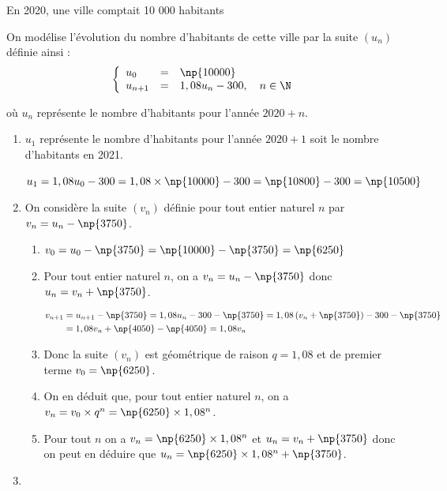 \medskip

En 2020, une ville comptait 10 000 habitants

On modélise l'évolution du nombre d'habitants de cette ville par la suite $(u_n)$ définie ainsi : 
\[\left\{\begin{array}{l c l}
u_0&=&\np{10000}\\
u_{n+1}&=&1,08u_n - 300,\quad n \in \N 
\end{array}\right.\]

où $u_n$ représente le nombre d'habitants pour l'année $2020 + n$.



\begin{enumerate}
\item
$u_1$  représente le nombre d'habitants pour l'année $2020 + 1$ soit le nombre d'habitants en 2021.

$u_{1}=1,08 u_0 - 300 = 1,08\times \np{10000}-300 = \np{10800}-300=\np{10500}$

\item On considère la suite $(v_n)$ définie pour tout entier naturel $n$ par $v_n = u_n  - \np{3750}$. 
	\begin{enumerate}
		\item 
$v_0=u_0 - 	\np{3750} = \np{10000} - \np{3750} = \np{6250}$
		
		\item 
Pour tout entier naturel $n$, on a $v_n=u_n-\np{3750}$ donc $u_n=v_n+\np{3750}$.

$\begin{aligned}
v_{n+1}
& =u_{n+1}-\np{3750}
 = 1,08u_n -300 -\np{3750}
= 1,08\left ( v_n +\np{3750} \right ) -300 - \np{3750}\\
& =1,08 v_n + \np{4050} - \np{4050}
= 1,08 v_n
\end{aligned}$

		\item
Donc la suite $(v_n)$ est géométrique de raison $q=1,08$ et de premier terme $v_0 = \np{6250}$.

		\item On en déduit que, pour tout entier naturel $n$, on a 
$v_n=v_0\times q^n = \np{6250}\times 1,08^n$.		
		
		\item 
Pour tout $n$ on a $v_n= \np{6250}\times 1,08^n$ et $u_n=v_n+\np{3750}$ donc on peut en déduire que $u_n = \np{6250}\times 1,08^n +\np{3750}$.
	\end{enumerate}
	
\item ~


\end{enumerate}
